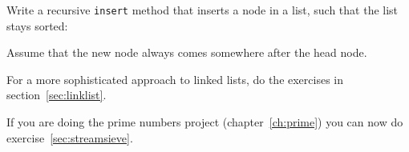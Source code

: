 \begin{exercise}
  \label{ex:linkedlist2}
  Write a recursive \lstinline{insert} method that inserts a node in a list, such that
  the list stays sorted:

  Assume that the new node always comes somewhere after the head node.
\end{exercise}

\begin{exercise}
  \label{ex:linkedlist3}
  For a more sophisticated approach to linked lists, do the exercises
  in section~\ref{sec:linklist}.
\end{exercise}

\begin{exercise}
  If you are doing the prime numbers project (chapter~\ref{ch:prime})
  you can now do exercise~\ref{sec:streamsieve}.
\end{exercise}

